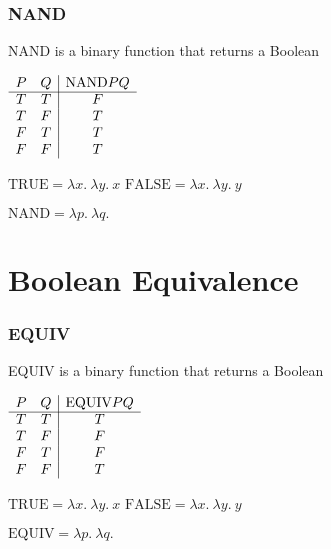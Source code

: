 \documentclass{beamer}
\begin{document}
\begin{frame}
	\frametitle{NAND}

	NAND is a binary function that returns a Boolean

	\begin{center}
		$\begin{array}{ c c | c }			
			P & Q & \text{NAND}PQ\\
			\cline{1 - 3}
			T & T & F \\ 
			T & F & T \\ 
			F & T & T \\ 
			F & F & T
		\end{array}$
	\end{center}

	$\text{TRUE} = \lambda x. \ \lambda y. \ x$ \hspace{4cm} $\text{FALSE} = \lambda x. \ \lambda y. \ y$

	\vspace{0.5cm}

	$\text{NAND} = \lambda p. \ \lambda q. \  $

	\vspace{5cm}
	
\end{frame}

\section{Boolean Equivalence}

\begin{frame}
	\frametitle{EQUIV}

	EQUIV is a binary function that returns a Boolean

	\begin{center}
		$\begin{array}{ c c | c }			
			P & Q & \text{EQUIV}PQ\\
			\cline{1 - 3}
			T & T & T \\ 
			T & F & F \\ 
			F & T & F \\ 
			F & F & T
		\end{array}$
	\end{center}



	$\text{TRUE} = \lambda x. \ \lambda y. \ x$ \hspace{4cm} $\text{FALSE} = \lambda x. \ \lambda y. \ y$

	\vspace{0.5cm}

	$\text{EQUIV} = \lambda p. \ \lambda q. \  $

	\vspace{5cm}
	
\end{frame}
   
\end{document}
